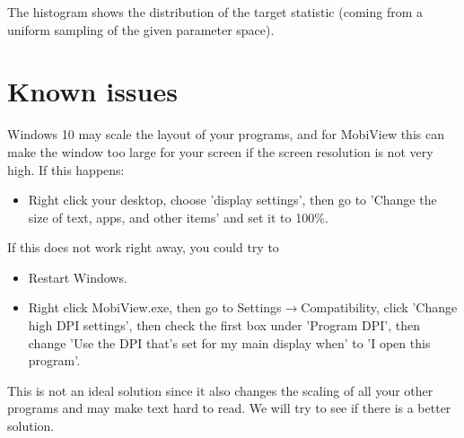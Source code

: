 \documentclass[11pt]{article}
\theoremstyle{definition}
\begin{document}
The histogram shows the distribution of the target statistic (coming from a uniform sampling of the given parameter space).

\section{Known issues}

Windows 10 may scale the layout of your programs, and for MobiView this can make the window too large for your screen if the screen resolution is not very high. If this happens:
\begin{itemize}
\item Right click your desktop, choose 'display settings', then go to 'Change the size of text, apps, and other items' and set it to 100\%.
\end{itemize}
If this does not work right away, you could try to
\begin{itemize}
\item Restart Windows.
\item Right click MobiView.exe, then go to Settings$\rightarrow$Compatibility, click 'Change high DPI settings', then check the first box under 'Program DPI', then change 'Use the DPI that's set for my main display when' to 'I open this program'.
\end{itemize}
This is not an ideal solution since it also changes the scaling of all your other programs and may make text hard to read. We will try to see if there is a better solution.



\end{document}
